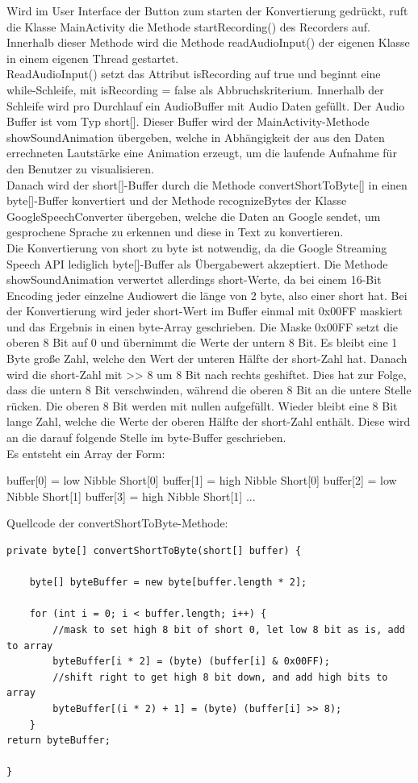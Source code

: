 Wird im User Interface der Button zum starten der Konvertierung gedrückt, ruft die Klasse MainActivity die Methode startRecording() des Recorders auf. Innerhalb dieser Methode wird die Methode readAudioInput() der eigenen Klasse in einem eigenen Thread gestartet.\\
ReadAudioInput() setzt das Attribut isRecording auf true und beginnt eine while-Schleife, mit isRecording = false als Abbruchskriterium. Innerhalb der Schleife wird pro Durchlauf ein AudioBuffer mit Audio Daten gefüllt. Der Audio Buffer ist vom Typ short[]. Dieser Buffer wird der MainActivity-Methode showSoundAnimation übergeben, welche in Abhängigkeit der aus den Daten errechneten Lautstärke eine Animation erzeugt, um die laufende Aufnahme für den Benutzer zu visualisieren.\\
Danach wird  der short[]-Buffer durch die Methode convertShortToByte[] in einen byte[]-Buffer konvertiert und der Methode recognizeBytes der Klasse GoogleSpeechConverter übergeben, welche die Daten an Google sendet, um gesprochene Sprache zu erkennen und diese in Text zu konvertieren.\\
Die Konvertierung von short zu byte ist notwendig, da die Google Streaming Speech API lediglich byte[]-Buffer als Übergabewert akzeptiert. Die Methode showSoundAnimation verwertet allerdings short-Werte, da bei einem 16-Bit Encoding jeder einzelne Audiowert die länge von 2 byte, also einer short hat. Bei der Konvertierung wird jeder short-Wert im Buffer einmal mit 0x00FF maskiert  und das Ergebnis in einen byte-Array geschrieben. Die Maske 0x00FF setzt die oberen 8 Bit auf 0 und übernimmt die Werte der untern 8 Bit. Es bleibt eine 1 Byte große Zahl, welche den Wert der unteren Hälfte der short-Zahl hat. Danach wird die short-Zahl mit >> 8 um 8 Bit nach rechts geshiftet. Dies hat zur Folge, dass die untern 8 Bit verschwinden, während die oberen 8 Bit an die untere Stelle rücken. Die oberen 8 Bit werden mit nullen aufgefüllt. Wieder bleibt eine 8 Bit lange Zahl, welche die Werte der oberen Hälfte der short-Zahl enthält. Diese wird an die darauf folgende Stelle im byte-Buffer geschrieben.\\
Es entsteht ein Array der Form:
\begin{addmargin}[1cm]{0cm}
	buffer[0] = low Nibble Short[0]
	buffer[1] = high Nibble Short[0]
	buffer[2] = low Nibble Short[1]
	buffer[3] = high Nibble Short[1]
	...
\end{addmargin}
Quellcode der convertShortToByte-Methode:
\begin{lstlisting}
private byte[] convertShortToByte(short[] buffer) {

	byte[] byteBuffer = new byte[buffer.length * 2];

	for (int i = 0; i < buffer.length; i++) {
		//mask to set high 8 bit of short 0, let low 8 bit as is, add to array
		byteBuffer[i * 2] = (byte) (buffer[i] & 0x00FF);
		//shift right to get high 8 bit down, and add high bits to array
		byteBuffer[(i * 2) + 1] = (byte) (buffer[i] >> 8);
	}
return byteBuffer;

}
\end{lstlisting}
